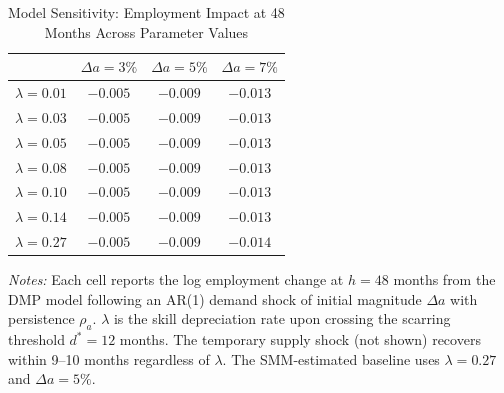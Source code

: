 \begin{table}[H]
\centering
\caption{Model Sensitivity: Employment Impact at 48 Months Across Parameter Values}
\begin{threeparttable}
\begin{tabular}{lccc}
\toprule
& $\Delta a = 3\%$ & $\Delta a = 5\%$ & $\Delta a = 7\%$ \\
\midrule
$\lambda = 0.01$ & $-0.005$ & $-0.009$ & $-0.013$ \\
$\lambda = 0.03$ & $-0.005$ & $-0.009$ & $-0.013$ \\
$\lambda = 0.05$ & $-0.005$ & $-0.009$ & $-0.013$ \\
$\lambda = 0.08$ & $-0.005$ & $-0.009$ & $-0.013$ \\
$\lambda = 0.10$ & $-0.005$ & $-0.009$ & $-0.013$ \\
$\lambda = 0.14$ & $-0.005$ & $-0.009$ & $-0.013$ \\
$\lambda = 0.27$ & $-0.005$ & $-0.009$ & $-0.014$ \\
\bottomrule
\end{tabular}
\begin{tablenotes}[flushleft]
\small
\item \textit{Notes:} Each cell reports the log employment change at $h = 48$ months from the DMP model following an AR(1) demand shock of initial magnitude $\Delta a$ with persistence $\rho_a$. $\lambda$ is the skill depreciation rate upon crossing the scarring threshold $d^* = 12$ months. The temporary supply shock (not shown) recovers within 9--10 months regardless of $\lambda$. The SMM-estimated baseline uses $\lambda = 0.27$ and $\Delta a = 5\%$.
\end{tablenotes}
\end{threeparttable}
\label{tab:sensitivity}
\end{table}
